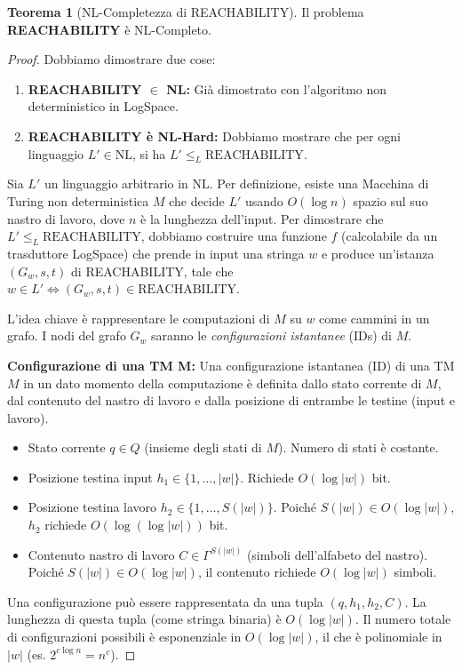 \documentclass[a4paper]{article}
\theoremstyle{definition} %
\newtheorem{theorem}{Teorema}
[section]
\begin{document}
\begin{theorem}[NL-Completezza di REACHABILITY]
Il problema \textbf{REACHABILITY} è NL-Completo.
\end{theorem}
\begin{proof}
Dobbiamo dimostrare due cose:
\begin{enumerate}
    \item \textbf{REACHABILITY $\in$ NL:} Già dimostrato con l'algoritmo non deterministico in LogSpace.
    \item \textbf{REACHABILITY è NL-Hard:} Dobbiamo mostrare che per ogni linguaggio $L' \in \text{NL}$, si ha $L' \le_L \text{REACHABILITY}$.
\end{enumerate}

Sia $L'$ un linguaggio arbitrario in $\text{NL}$. Per definizione, esiste una Macchina di Turing non deterministica $M$ che decide $L'$ usando $O(\log n)$ spazio sul suo nastro di lavoro, dove $n$ è la lunghezza dell'input.
Per dimostrare che $L' \le_L \text{REACHABILITY}$, dobbiamo costruire una funzione $f$ (calcolabile da un trasduttore LogSpace) che prende in input una stringa $w$ e produce un'istanza $(G_w, s, t)$ di REACHABILITY, tale che $w \in L' \iff (G_w, s, t) \in \text{REACHABILITY}$.

L'idea chiave è rappresentare le computazioni di $M$ su $w$ come cammini in un grafo. I nodi del grafo $G_w$ saranno le \emph{configurazioni istantanee} (IDs) di $M$.

\textbf{Configurazione di una TM M:} Una configurazione istantanea (ID) di una TM $M$ in un dato momento della computazione è definita dallo stato corrente di $M$, dal contenuto del nastro di lavoro e dalla posizione di entrambe le testine (input e lavoro).
\begin{itemize}
    \item Stato corrente $q \in Q$ (insieme degli stati di $M$). Numero di stati è costante.
    \item Posizione testina input $h_1 \in \{1, \dots, |w|\}$. Richiede $O(\log |w|)$ bit.
    \item Posizione testina lavoro $h_2 \in \{1, \dots, S(|w|)\}$. Poiché $S(|w|) \in O(\log |w|)$, $h_2$ richiede $O(\log(\log |w|))$ bit.
    \item Contenuto nastro di lavoro $C \in \Gamma^{S(|w|)}$ (simboli dell'alfabeto del nastro). Poiché $S(|w|) \in O(\log |w|)$, il contenuto richiede $O(\log |w|)$ simboli.
\end{itemize}
Una configurazione può essere rappresentata da una tupla $(q, h_1, h_2, C)$. La lunghezza di questa tupla (come stringa binaria) è $O(\log |w|)$.
Il numero totale di configurazioni possibili è esponenziale in $O(\log |w|)$, il che è polinomiale in $|w|$ (es. $2^{c \log n} = n^c$).


\end{proof}
\end{document}
